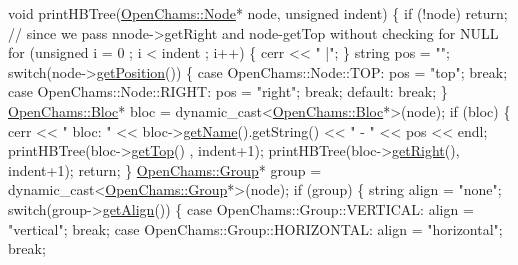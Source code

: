 \begin{DoxyCodeInclude}
\textcolor{keywordtype}{void} printHBTree(\hyperlink{class_open_chams_1_1_node}{OpenChams::Node}* node, \textcolor{keywordtype}{unsigned} indent) \{
    \textcolor{keywordflow}{if} (!node) \textcolor{keywordflow}{return}; \textcolor{comment}{// since we pass nnode->getRight and node-getTop without checking for NULL}
    \textcolor{keywordflow}{for} (\textcolor{keywordtype}{unsigned} i = 0 ; i < indent ; i++) \{
        cerr << \textcolor{stringliteral}{" |"};
    \}
    \textcolor{keywordtype}{string} pos = \textcolor{stringliteral}{""};
    \textcolor{keywordflow}{switch}(node->\hyperlink{class_open_chams_1_1_node_a566f4d0bebb46cfd31384a8394a7dbb9}{getPosition}()) \{
        \textcolor{keywordflow}{case} OpenChams::Node::TOP:
            pos = \textcolor{stringliteral}{"top"};
            \textcolor{keywordflow}{break};
        \textcolor{keywordflow}{case} OpenChams::Node::RIGHT:
            pos = \textcolor{stringliteral}{"right"};
            \textcolor{keywordflow}{break};
        \textcolor{keywordflow}{default}:
            \textcolor{keywordflow}{break};
    \}
    \hyperlink{class_open_chams_1_1_bloc}{OpenChams::Bloc}* bloc = \textcolor{keyword}{dynamic\_cast<}\hyperlink{class_open_chams_1_1_bloc}{OpenChams::Bloc}*\textcolor{keyword}{>}(node);
    \textcolor{keywordflow}{if} (bloc) \{
        cerr << \textcolor{stringliteral}{" bloc: "} << bloc->\hyperlink{class_open_chams_1_1_node_a3fd7335faa33dce2f87c7e50eef3e294}{getName}().getString() << \textcolor{stringliteral}{" - "} << pos << endl;
        printHBTree(bloc->\hyperlink{class_open_chams_1_1_node_af59967a8c2d5a04ca0a58e2ef29bead1}{getTop}()  , indent+1);
        printHBTree(bloc->\hyperlink{class_open_chams_1_1_node_a9533ddcf078ddfc2a4e9bd9ffafa51cb}{getRight}(), indent+1);
        \textcolor{keywordflow}{return};
    \}
    \hyperlink{class_open_chams_1_1_group}{OpenChams::Group}* group = \textcolor{keyword}{dynamic\_cast<}\hyperlink{class_open_chams_1_1_group}{OpenChams::Group}*\textcolor{keyword}{>}(node);
    \textcolor{keywordflow}{if} (group) \{
        \textcolor{keywordtype}{string} align = \textcolor{stringliteral}{"none"};
        \textcolor{keywordflow}{switch}(group->\hyperlink{class_open_chams_1_1_group_a7cff0c4a6957f23fb1ea4598f4b8a0b8}{getAlign}()) \{
            \textcolor{keywordflow}{case} OpenChams::Group::VERTICAL:
                align = \textcolor{stringliteral}{"vertical"};
                \textcolor{keywordflow}{break};
            \textcolor{keywordflow}{case} OpenChams::Group::HORIZONTAL:
                align = \textcolor{stringliteral}{"horizontal"};
                \textcolor{keywordflow}{break};

\end{DoxyCodeInclude}
